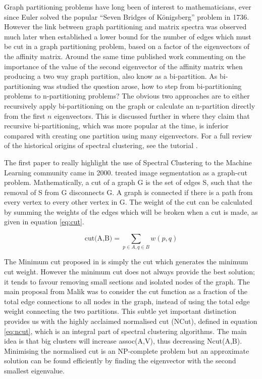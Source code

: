 \documentclass[12pt]{report}		%
\begin{document}
Graph partitioning problems have long been of interest to mathematicians, ever since Euler solved the popular ``Seven Bridges of K\"{o}nigsberg'' problem in 1736. However the link between graph partitioning and matrix spectra was observed much later when \cite{Donath1973} established a lower bound for the number of edges which must be cut in a graph partitioning problem, based on  a factor of the eigenvectors of the affinity matrix. Around the same time \cite{Fiedler1973} published work commenting on the importance of the value of the second eigenvector of the affinity matrix when producing a two way graph partition, also know as a bi-partition. As bi-partitioning was studied the question arose, how to step from bi-partitioning problems to n-partitioning problems? The obvious two approaches are to either recursively apply bi-partitioning on the graph or calculate an n-partition directly from the first $n$ eigenvectors. This is discussed further in \cite{Alpert1995} where they claim that recursive bi-partitioning, which was more popular at the time, is inferior compared with creating one partition using many eigenvectors. For a full review of the historical origins of spectral clustering, see the tutorial \cite{Luxburg2008}.

The first paper to really highlight the use of Spectral Clustering to the Machine Learning community came in 2000. \cite{Malik2000} treated image segmentation as a graph-cut problem. Mathematically, a cut of a graph G is the set of edges S, such that the removal of S from G disconnects G. A graph is connected if there is a path from every vertex to every other vertex in G. The weight of the cut can be calculated by summing the weights of the edges which will be broken when a cut is made, as given in equation \eqref{eq:cut}. 


\begin{equation}
  \text{cut(A,B)} = \sum_{p \in A, q \in B} w(p,q)
  \label{eq:cut}
\end{equation}

The Minimum cut proposed in \citep{Wu1993} is simply the cut which generates the minimum cut weight. However the  minimum cut does not always provide the best solution; it tends to favour removing small sections and isolated nodes of the graph.  The main proposal from Malik was to consider the cut function as a fraction of the total edge connections to all nodes in the graph, instead of using the total edge weight connecting the two partitions. This subtle yet important distinction provides us with the highly acclaimed normalised cut (NCut), defined in equation \eqref{eq:ncut}, which is an integral part of spectral clustering algorithms.  The main idea is that big clusters will increase assoc(A,V), thus decreasing Ncut(A,B).  Minimising the normalised cut is an NP-complete problem but an approximate solution can be found efficiently by finding the eigenvector with the second smallest eigenvalue. 
  
\end{document}
